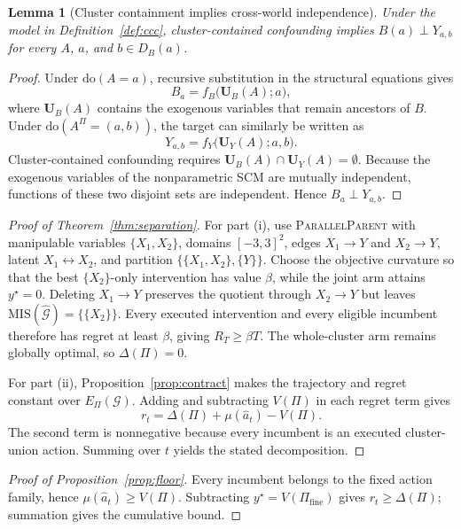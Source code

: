 \documentclass[twoside]{article}
\newtheorem{lemma}{Lemma}
\newcommand{\doo}{\mathrm{do}}
\newcommand{\Gg}{\mathcal{G}}
\begin{document}
\begin{lemma}[Cluster containment implies cross-world independence]
\label{lem:ccc} 
Under the model in Definition~\ref{def:ccc}, cluster-contained confounding implies $B(a)\perp Y_{a,b}$ for every $A$, $a$, and $b\in D_B(a)$.
\end{lemma}

\begin{proof}
Under $\doo(A=a)$, recursive substitution in the structural equations gives
\[
  B_a=f_B\bigl(\mathbf U_B(A);a\bigr),
\]
where $\mathbf U_B(A)$ contains the exogenous variables that remain
ancestors of $B$. Under
$\doo(A^\Pi=(a,b))$, the target can similarly be written
as
\[
  Y_{a,b}=f_Y\bigl(\mathbf U_Y(A);a,b\bigr).
\]
Cluster-contained confounding requires
$\mathbf U_B(A)\cap\mathbf U_Y(A)=\emptyset$. Because the exogenous variables of the nonparametric SCM are mutually independent, functions of these two disjoint sets are independent. Hence $B_a\perp Y_{a,b}$.
\end{proof}

\begin{proof}[Proof of Theorem~\ref{thm:separation}]
For part (i), use \textsc{ParallelParent} with manipulable variables $\{X_1,X_2\}$, domains $[-3,3]^2$, edges $X_1\to Y$ and $X_2\to Y$, latent $X_1\leftrightarrow X_2$, and partition $\{\{X_1,X_2\},\{Y\}\}$. Choose the objective curvature so that the best $\{X_2\}$-only intervention has value $\beta$, while the joint arm attains $y^\star=0$. Deleting $X_1\to Y$ preserves the quotient through $X_2\to Y$ but leaves $\mathrm{MIS}(\widehat{\mathcal G})=\{\{X_2\}\}$. Every executed intervention and every eligible incumbent therefore has regret at least $\beta$, giving $R_T\ge\beta T$. The whole-cluster arm remains globally optimal, so $\Delta(\Pi)=0$.

For part (ii), Proposition~\ref{prop:contract} makes the trajectory and regret constant over $E_\Pi(\Gg)$. Adding and subtracting $V(\Pi)$ in each regret term gives
\[
 r_t=\Delta(\Pi)+\mu(\hat a_t)-V(\Pi).
\]
The second term is nonnegative because every incumbent is an executed cluster-union action. Summing over $t$ yields the stated decomposition.
\end{proof}

\begin{proof}[Proof of Proposition~\ref{prop:floor}]
Every incumbent belongs to the fixed action family, hence
$\mu(\hat a_t)\ge V(\Pi)$. Subtracting
$y^\star=V(\Pi_{\mathrm{fine}})$ gives $r_t\ge\Delta(\Pi)$; summation gives the
cumulative bound.
\end{proof}
\end{document}
